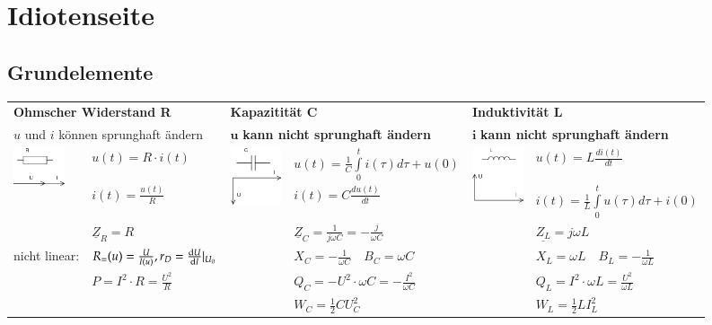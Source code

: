 \section{Idiotenseite}

\subsection{Grundelemente}
\begin{tabular}{p{1.5cm} p{4.3cm} |p{1.5cm} p{4.3cm}| p{1.5cm} p{4.3cm}}
	\multicolumn{2}{l}{\textbf{Ohmscher Widerstand R}}
	& \multicolumn{2}{l}{\textbf{Kapazitität C}}
	& \multicolumn{2}{l}{\textbf{Induktivität L}} \\
	\multicolumn{2}{l}{$u$ und $i$ können sprunghaft ändern}
	& \multicolumn{2}{l}{$\mathbf{u}$ \textbf{kann nicht sprunghaft ändern}}
	& \multicolumn{2}{l}{$\mathbf{i}$ \textbf{kann nicht sprunghaft ändern}} \\
	
	\multirow{2}{1.5cm}{
		\includegraphics[width=1.5cm]{./images/zeigerdiag-r.png}}
	& $u(t) = R \cdot i(t)$ 
	& \multirow{2}{1.5cm}{\includegraphics[width=1.5cm]{./images/zeigerdiag-c.png}}
	& $u(t) = \frac{1}{C} \int\limits_0^t i(\tau) d\tau + u(0)$
	& 
	\multirow{2}{1.5cm}{\includegraphics[width=1.5cm]{./images/zeigerdiag-l.png}}
	&$u(t) = L \frac{di(t)}{dt}$\\
	
	&$i(t) = \frac{u(t)}{R}$
	& & $i(t) = C \frac{d u(t)}{dt}$
	& & $i(t) = \frac{1}{L} \int\limits_0^t u(\tau) d\tau + i(0)$\\
	
	& $\underline{Z}_R = R$
	& & $\underline{Z}_C = \frac{1}{j \omega C} = - \frac{j}{\omega C}$
	& & $\underline{Z_L} = j \omega L$\\
	
	\parbox{1.7cm}{\small{nicht linear:}}
	& $R_=(u) = \frac{U}{I(u)}, r_D = \frac{\mathop{}\!\mathrm{d} U}{\mathop{}\!\mathrm{d} I}\lvert_{U_0}$
	& & $X_C = -\frac{1}{\omega C} \quad B_C = \omega C$
	& & $X_L = \omega L
	\quad B_L = -\frac{1}{\omega L}$ \\
	
	& $P=I^2 \cdot R = \frac{U^2}{R}$
	& & $Q_C= - U^2 \cdot \omega C = - \frac{I^2}{\omega C}$
	& & $Q_L= I^2 \cdot \omega L = \frac{U^2}{\omega L}$\\
	
	& & & $W_C=\frac12 C U_C^2$
	& &$W_L=\frac12 L I_L^2$
\end{tabular}

